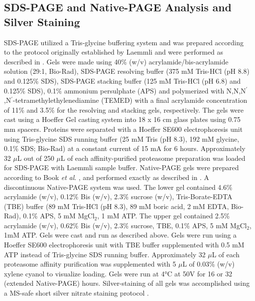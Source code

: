 \subsection{SDS-PAGE and Native-PAGE Analysis and Silver Staining}
	SDS-PAGE utilized a Tris-glycine buffering system and was prepared according to the protocol originally established by Laemmli \citep{laemmli70} and were performed as described in \citep{marshall17}. Gels were made using 40\% (w/v) acrylamide/bis-acrylamide solution (29:1, Bio-Rad), SDS-PAGE resolving buffer (375 mM Tris-HCl (pH 8.8) and 0.125\% SDS), SDS-PAGE stacking buffer (125 mM Tris-HCl (pH 6.8) and 0.125\% SDS), 0.1\% ammonium persulphate (APS) and polymerized with N,N,N$^{\prime}$,N$^{\prime}$-tetramethylethylenediamine (TEMED) with a final acrylamide concentration of 11\% and 3.5\% for the resolving and stacking gels, respectively. The gels were cast using a Hoeffer Gel casting system into 18 x 16 cm glass plates using 0.75 mm spacers. Proteins were separated with a Hoeffer SE600 electrophoresis unit using Tris-glycine SDS running buffer (25 mM Tris (pH 8.3), 192 mM glycine, 0.1\% SDS; Bio-Rad) at a constant current of 15 mA for 6 hours. Approximately 32 $\mu$L out of 250 $\mu$L of each affinity-purified proteasome preparation was loaded for SDS-PAGE with Laemmli sample buffer. 	 
Native-PAGE gels were prepared according to Book \textit{et al}. \citep{book10}, and performed exactly as described in \citep{marshall17}. A discontinuous Native-PAGE system was used. The lower gel contained 4.6\% acrylamide (w/v), 0.12\% Bis (w/v), 2.3\% sucrose (w/v), Tris-Borate-EDTA (TBE) buffer (89 mM Tris-HCl (pH 8.3), 89 mM boric acid, 2 mM EDTA, Bio-Rad), 0.1\% APS, 5 mM MgCl$_{2}$, 1 mM ATP. The upper gel contained 2.5\% acrylamide (w/v), 0.62\% Bis (w/v), 2.3\% sucrose, TBE, 0.1\% APS, 5 mM MgCl$_{2}$, 1mM ATP. Gels were cast and run as described above. Gels were run using a Hoeffer SE600 electrophoresis unit with TBE buffer supplemented with 0.5 mM ATP instead of Tris-glycine SDS running buffer. Approximately 32 $\mu$L of each proteasome affinity purification was supplemented with 5 $\mu$L of 0.03\% (w/v) xylene cyanol to visualize loading. Gels were run at 4°C at 50V for 16 or 32 (extended Native-PAGE) hours. Silver-staining of all gels was accomplished using a MS-safe short silver nitrate staining protocol \citep{chevallet06}.
